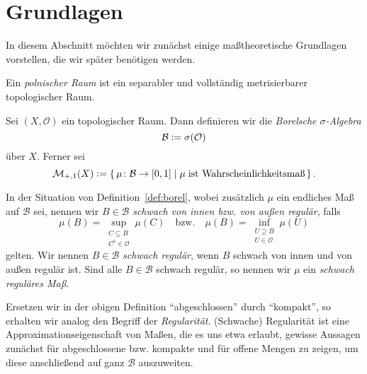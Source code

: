 \documentclass[../main/main.tex]{subfiles}
\begin{document}
	
	\section{Grundlagen}
	\label{Grundlagen}
	
	In diesem Abschnitt möchten wir zunächst einige maßtheoretische Grundlagen vorstellen, 
	die wir später benötigen werden.

	\begin{Definition}
		Ein \emph{polnischer Raum} ist ein separabler und vollständig metrisierbarer topologischer Raum.
	\end{Definition}

	\begin{Definition}
		\label{def:borel}
		Sei $(X, \mathcal{O})$ ein topologischer Raum. Dann definieren wir die \emph{Borelsche 
		$\sigma$-Algebra}
		$$\mathcal{B} \vcentcolon = \sigma(\mathcal{O})$$
		über $X$. Ferner sei
		$$\mathcal{M}_{+,1}(X) \vcentcolon = \left\{\, \mu \colon \mathcal{B} \to [0,1] \; | \; \mu \; 
			\text{ist Wahrscheinlichkeitsmaß} \,\right\}\text{.}$$
	\end{Definition}

	\begin{Definition}
		\label{def:regularity}
		In der Situation von Definition~\ref{def:borel}, wobei zusätzlich $\mu$ ein 
		endliches Maß auf $\mathcal{B}$ sei, nennen wir $B \in \mathcal{B}$ \emph{schwach von 
		innen bzw. von außen regulär}, falls
		$$\mu(B) = \sup_{\substack{C \subseteq B \\ C^\mathsf{c} \in \mathcal{O}}} \mu(C) 
		\quad \text{bzw.} \quad \mu(B) = \inf_{\substack{U \supseteq B \\ U \in \mathcal{O}}} 
		\mu(U)$$
		gelten. Wir nennen $B \in \mathcal{B}$ \emph{schwach regulär}, wenn $B$ schwach von innen und 
		von außen regulär ist. Sind alle $B \in \mathcal{B}$ schwach regulär, 
		so nennen wir $\mu$ ein \emph{schwach reguläres Maß}.
	\end{Definition}

	\begin{Bemerkung}
		Ersetzen wir in der obigen Definition \enquote{abgeschlossen} durch \enquote{kompakt}, 
		so erhalten wir analog den Begriff der \emph{Regularität}. (Schwache) Regularität ist eine 
		Approximationseigenschaft von Maßen, die es uns etwa erlaubt, gewisse Aussagen 
		zunächst für abgeschlossene bzw. kompakte und für offene Mengen zu zeigen, um diese 
		anschließend auf ganz $\mathcal{B}$ auszuweiten.
	\end{Bemerkung}
\end{document}
